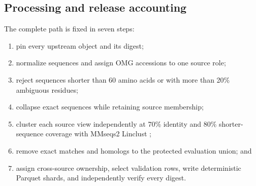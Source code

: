 \documentclass{article}
\begin{document}
\begin{table}[H]
  \centering
  \scriptsize
  \caption{Stage-aligned comparison with the cluster counts reported by ESMC.
  The roughly 1.68B-representative JGI-role gap dominates the difference.}
  \label{tab:source-gap}
\end{table}

\subsection{Processing and release accounting}

The complete path is fixed in seven steps:

\begin{enumerate}
  \item pin every upstream object and its digest;
  \item normalize sequences and assign OMG accessions to one source role;
  \item reject sequences shorter than 60 amino acids or with more than 20\%
        ambiguous residues;
  \item collapse exact sequences while retaining source membership;
  \item cluster each source view independently at 70\% identity and 80\%
        shorter-sequence coverage with MMseqs2 Linclust
        \citep{steinegger2018linclust};
  \item remove exact matches and homologs to the protected evaluation union;
        and
  \item assign cross-source ownership, select validation rows, write
        deterministic Parquet shards, and independently verify every digest.
\end{enumerate}
\end{document}
